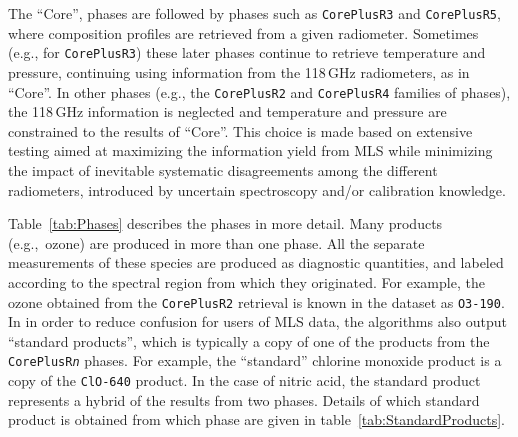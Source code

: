\documentclass[11pt,draft]{report}
\begin{document}
The ``Core'', phases are followed by phases such as \texttt{CorePlusR3} and
\texttt{CorePlusR5}, where composition profiles are retrieved from a given
radiometer.  Sometimes (e.g., for \texttt{CorePlusR3}) these later phases
continue to retrieve temperature and pressure, continuing using
information from the 118\,GHz radiometers, as in ``Core''.  In other
phases (e.g., the \texttt{CorePlusR2} and \texttt{CorePlusR4} families of phases), the
118\,GHz information is neglected and temperature and pressure are
constrained to the results of ``Core''.  This choice is made based on
extensive testing aimed at maximizing the information yield from MLS
while minimizing the impact of inevitable systematic disagreements among
the different radiometers, introduced by uncertain spectroscopy and/or
calibration knowledge.

Table~\ref{tab:Phases} describes the phases in more detail.  Many
products (e.g.,\ ozone) are produced in more than one phase.  All the
separate measurements of these species are produced as diagnostic
quantities, and labeled according to the spectral region from which they
originated.  For example, the ozone obtained from the
\texttt{CorePlusR2} retrieval is known in the \thisv dataset as
\texttt{O3-190}.  In \thisv in order to reduce confusion for users of
MLS data, the algorithms also output ``standard products'', which is
typically a copy of one of the products from the
\texttt{CorePlusR\emph{n}} phases.  For example, the ``standard''
chlorine monoxide product is a copy of the \texttt{ClO-640} product.  In
the case of \thisv nitric acid, the standard product represents a hybrid
of the results from two phases.  Details of which standard product is
obtained from which phase are given in table~\ref{tab:StandardProducts}.

\newcommand{\mybox}[2]{\parbox[m]{#1}{\raggedright #2}}
\newcommand{\phase}[1]{\mybox{1.0in}{\texttt{#1}}}
\newcommand{\species}[1]{\mybox{2.2in}{#1}}
\newcommand{\measurements}[1]{\mybox{1.5in}{#1}}
\newcommand{\tablecomments}[1]{\mybox{3.6in}{#1}}
\end{document}
